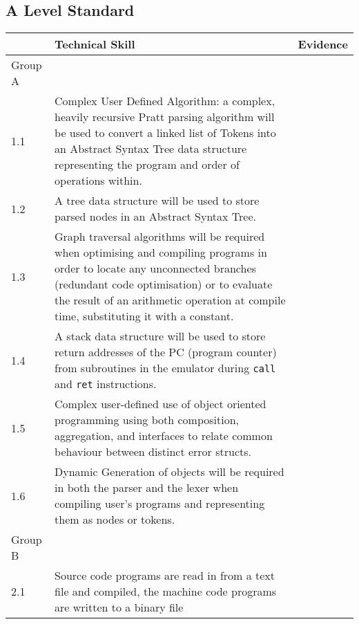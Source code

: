 \subsection{A Level Standard}

\begin{longtable}{ | p{2cm} | p{10cm} | p{3cm} | } 
    \hline
     & Technical Skill & Evidence\\
    \hline 
    Group A & & \\
    \hline
    1.1 & Complex User Defined Algorithm: a complex, heavily recursive Pratt parsing algorithm will be used to convert a linked list of Tokens into an Abstract Syntax Tree data structure representing the program and order of operations within. & \\
    \hline
    1.2 & A tree data structure will be used to store parsed nodes in an Abstract Syntax Tree. & \\
    \hline
    1.3 & Graph traversal algorithms will be required when optimising and compiling programs in order to locate any unconnected branches (redundant code optimisation) or to evaluate the result of an arithmetic operation at compile time, substituting it with a constant. & \\
    \hline
    1.4 & A stack data structure will be used to store return addresses of the PC (program counter) from subroutines in the emulator during \texttt{call} and \texttt{ret} instructions. & \\
    \hline
    1.5 & Complex user-defined use of object oriented programming using both composition, aggregation, and interfaces to relate common behaviour between distinct error structs. & \\
    \hline
    1.6 & Dynamic Generation of objects will be required in both the parser and the lexer when compiling user's programs and representing them as nodes or tokens. & \\
    \hline
    Group B & & \\
    \hline
    2.1 & Source code programs are read in from a text file and compiled, the machine code programs are written to a binary file & \\
    \hline
\end{longtable}
